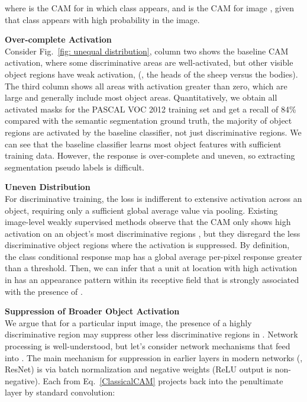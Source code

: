 \documentclass[10pt,twocolumn,letterpaper]{article}
\begin{document}
where  is the CAM for  in which  class  appears, and  is the CAM for image , 
given
that class  appears with high probability in the image.

\noindent\textbf{Over-complete Activation}\\
Consider Fig.~\ref{fig: unequal distribution}, column two  shows the baseline CAM activation, where some discriminative areas are well-activated, but other visible object regions have weak activation, (\eg, the heads of the sheep versus the bodies). The third column shows all areas with activation greater than zero, which are large and generally include most object areas. Quantitatively, we obtain all activated masks for the PASCAL VOC 2012 training set and get a recall of 84\% compared with the semantic segmentation ground truth, \ie the majority of object regions are activated by the baseline classifier, not just discriminative regions.
We can see that the baseline classifier learns most object features with sufficient training data.
However, the response is over-complete and uneven,
so extracting segmentation pseudo labels is difficult.


\noindent\textbf{Uneven Distribution}\\
For discriminative training, the loss is indifferent to extensive activation across an object, requiring only a sufficient global average value via pooling.
Existing image-level weakly supervised methods observe that the CAM only shows high activation on an object's most discriminative regions \cite{wei2017object, singh2017hide, wei2018revisiting, hou2018self, chang2020mixup, guo2019mixup, chang2020weakly, wang2020self, zhang2020splitting},
but they disregard the less discriminative object regions where the activation is suppressed.
By definition, the class conditional response map has a global average per-pixel response greater than a threshold. Then, we can infer that a unit  at location  with high activation in  has an appearance pattern within its receptive field that is strongly associated with the presence of .

\noindent\textbf{Suppression of Broader Object Activation}\\
We argue that for a particular input image, the presence of a highly discriminative region may suppress other less discriminative regions in . 
Network processing is well-understood, but let's
consider network mechanisms that feed into .
The main mechanism for suppression in earlier layers in modern networks (\eg, ResNet) is via batch normalization and negative weights (ReLU output is non-negative). Each  from 
Eq.~\ref{ClassicalCAM} projects back into the penultimate layer by standard convolution:
\end{document}
